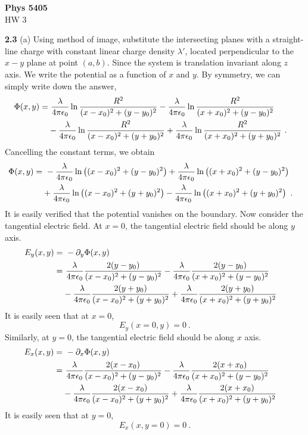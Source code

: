 \documentclass[12pt]{article}
\begin{document}
\begin{center}
{\bf Phys 5405}\\
HW 3
\end{center}
\textbf{2.3} (a) Using method of image, substitute the intersecting planes with a straight-line charge with constant linear charge density $\lambda'$, located perpendicular to the $x-y$ plane at point $(a,b)$. Since the system is translation invariant along $z$ axis. We write the potential as a function of $x$ and $y$. By symmetry, we can simply write down the answer,
\begin{align}
    \Phi(x,y) = &~ \frac{\lambda}{4 \pi \epsilon_0} \ln\frac{R^2}{(x-x_0)^2 + (y - y_0)^2}
    - \frac{\lambda}{4 \pi \epsilon_0} \ln\frac{R^2}{(x+x_0)^2 + (y - y_0)^2}\cr
    &- \frac{\lambda}{4 \pi \epsilon_0} \ln\frac{R^2}{(x-x_0)^2 + (y + y_0)^2} + \frac{\lambda}{4 \pi \epsilon_0} \ln\frac{R^2}{(x+x_0)^2 + (y + y_0)^2}~.\nonumber
\end{align}
Cancelling the constant terms, we obtain
\begin{align}
    \Phi(x,y) = &~ -\frac{\lambda}{4 \pi \epsilon_0} \ln\left({(x-x_0)^2 + (y - y_0)^2}\right)
    + \frac{\lambda}{4 \pi \epsilon_0} \ln\left({(x+x_0)^2 + (y - y_0)^2}\right)\cr
    &+ \frac{\lambda}{4 \pi \epsilon_0} \ln\left({(x-x_0)^2 + (y + y_0)^2}\right) - \frac{\lambda}{4 \pi \epsilon_0} \ln\left({(x+x_0)^2 + (y + y_0)^2}\right)~.\nonumber
\end{align}
It is easily verified that the potential vanishes on the boundary. Now consider the tangential electric field. At $x = 0$, the tangential electric field should be along $y$ axis.
\begin{align} \label{eqn:partial-y}
    E_y(x,y) =&~ - \partial_y \Phi(x,y) \cr
    =&~ \frac{\lambda}{4\pi\epsilon_0} \frac{2(y-y_0)}{(x-x_0)^2 + (y - y_0)^2} - \frac{\lambda}{4\pi\epsilon_0} \frac{2(y-y_0)}{(x+x_0)^2 + (y - y_0)^2}\cr
    &-\frac{\lambda}{4\pi\epsilon_0} \frac{2(y+y_0)}{(x-x_0)^2 + (y + y_0)^2} + \frac{\lambda}{4\pi\epsilon_0} \frac{2(y+y_0)}{(x+x_0)^2 + (y + y_0)^2}
\end{align}
It is easily seen that at $x = 0$,
\begin{equation}
    E_y (x=0,y) = 0~.
\end{equation}
Similarly, at $y = 0$, the tangential electric field should be along $x$ axis.
\begin{align} \label{eqn:partial-x}
    E_x(x,y) =&~ - \partial_x \Phi(x,y) \cr
    =&~ \frac{\lambda}{4\pi\epsilon_0} \frac{2(x-x_0)}{(x-x_0)^2 + (y - y_0)^2} - \frac{\lambda}{4\pi\epsilon_0} \frac{2(x+x_0)}{(x+x_0)^2 + (y - y_0)^2}\cr
    &-\frac{\lambda}{4\pi\epsilon_0} \frac{2(x-x_0)}{(x-x_0)^2 + (y + y_0)^2} + \frac{\lambda}{4\pi\epsilon_0} \frac{2(x+x_0)}{(x+x_0)^2 + (y + y_0)^2}
\end{align}
It is easily seen that at $y = 0$,
\begin{equation}
    E_x(x,y=0) = 0~.
\end{equation}
\end{document}
